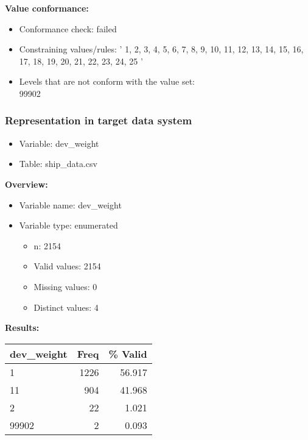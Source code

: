 \documentclass[
]{article}
\providecommand{\tightlist}{%
  \setlength{\itemsep}{0pt}\setlength{\parskip}{0pt}}
\begin{document}
\textbf{Value conformance:}

\begin{itemize}
\tightlist
\item
  Conformance check: failed
\item
  Constraining values/rules: ' 1, 2, 3, 4, 5, 6, 7, 8, 9, 10, 11, 12,
  13, 14, 15, 16, 17, 18, 19, 20, 21, 22, 23, 24, 25 '
\item
  Levels that are not conform with the value set:\\
  99902
\end{itemize}

\newpage

\hypertarget{representation-in-target-data-system-7}{%
\subsubsection{\texorpdfstring{Representation in \textbf{target} data
system}{Representation in target data system}}\label{representation-in-target-data-system-7}}

\begin{itemize}
\tightlist
\item
  Variable: dev\_weight
\item
  Table: ship\_data.csv
\end{itemize}

\textbf{Overview:}

\begin{itemize}
\tightlist
\item
  Variable name: dev\_weight
\item
  Variable type: enumerated

  \begin{itemize}
  \tightlist
  \item
    n: 2154
  \item
    Valid values: 2154
  \item
    Missing values: 0
  \item
    Distinct values: 4
  \end{itemize}
\end{itemize}

\textbf{Results:}\\

\begin{table}[H]
\centering
\begin{tabular}{l|r|r}
\hline
\textbf{dev\_weight} & \textbf{Freq} & \textbf{\% Valid}\\
\hline
1 & 1226 & 56.917\\
\hline
11 & 904 & 41.968\\
\hline
2 & 22 & 1.021\\
\hline
99902 & 2 & 0.093\\
\hline
\end{tabular}
\end{table}
\end{document}
